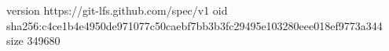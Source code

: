 version https://git-lfs.github.com/spec/v1
oid sha256:c4ce1b4e4950de971077c50caebf7bb3b3fc29495e103280eee018ef9773a344
size 349680
